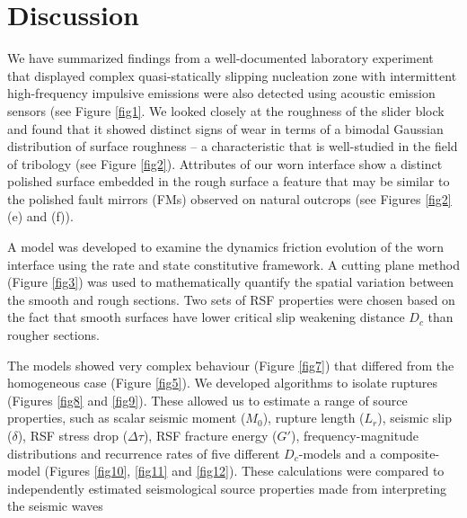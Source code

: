 \documentclass[final,3p, 11pt,authoryear]{elsarticle}
\begin{document}
\section{Discussion}
We have summarized findings from a well-documented laboratory experiment \citep{Selvadurai2015, Selvadurai2017, Selvadurai2019} that displayed complex quasi-statically slipping nucleation zone with intermittent high-frequency impulsive emissions were also detected using acoustic emission sensors (see Figure \ref{fig1}. We looked closely at the roughness of the slider block and found that it showed distinct signs of wear in terms of a bimodal Gaussian distribution of surface roughness -- a characteristic that is well-studied in the field of tribology (see Figure \ref{fig2}). Attributes of our worn interface show a distinct polished surface embedded in the rough surface a feature that may be similar to the polished fault mirrors (FMs) observed on natural outcrops (see Figures \ref{fig2}(e) and (f)).

A model was developed to examine the dynamics friction evolution of the worn interface using the rate and state constitutive framework. A cutting plane method (Figure \ref{fig3}) was used to mathematically quantify the spatial variation between the smooth and rough sections. Two sets of RSF properties were chosen based on the fact that smooth surfaces have lower critical slip weakening distance $D_{c}$ than rougher sections.  

The models showed very complex behaviour (Figure \ref{fig7}) that differed from the homogeneous case (Figure \ref{fig5}).  We developed algorithms to isolate ruptures (Figures \ref{fig8} and \ref{fig9}).  These allowed us to estimate a range of source properties, such as scalar seismic moment ($M_{0}$), rupture length ($L_{r}$), seismic slip ($\delta$), RSF stress drop ($\Delta\tau$), RSF fracture energy ($G'$), frequency-magnitude distributions and recurrence rates of five different $D_{c}$-models and a composite-model (Figures \ref{fig10}, \ref{fig11} and \ref{fig12}). These calculations were compared to independently estimated seismological source properties made from interpreting the seismic waves \citep{Selvadurai2019}
\end{document}
